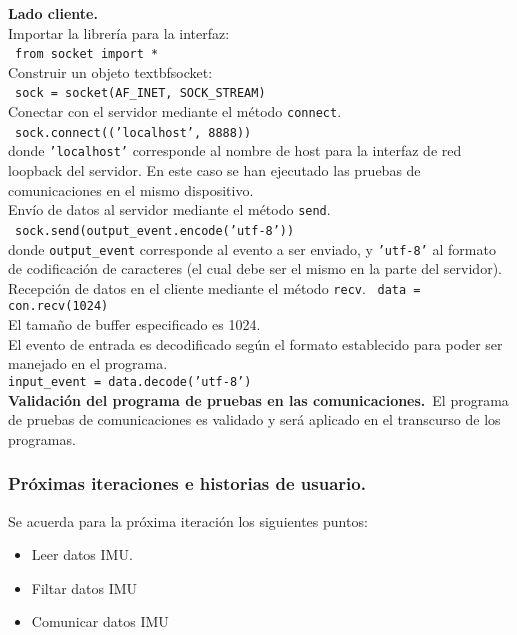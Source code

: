\textbf{Lado cliente.}\\
Importar la librería para la interfaz:\\
\medskip\
\texttt{from socket import *}\\
Construir un objeto textbf{socket}:\\
\medskip\
\texttt{sock = socket(AF\_INET, SOCK\_STREAM)}\\
Conectar con el servidor mediante el método \texttt{connect}.\\
\medskip\
\texttt{sock.connect(('localhost', 8888))}\\
donde \texttt{'localhost'} corresponde al nombre de host para la interfaz de red loopback del servidor. En este caso se han ejecutado las pruebas de comunicaciones en el mismo dispositivo.\\
Envío de datos al servidor mediante el método \texttt{send}.\\
\medskip\
\texttt{sock.send(output\_event.encode('utf-8'))}\\
donde \texttt{output\_event} corresponde al evento a ser enviado, y \texttt{'utf-8'} al formato de codificación de caracteres (el cual debe ser el mismo en la parte del servidor).\\
Recepción de datos en el cliente mediante el método \texttt{recv}.\
\medskip
\texttt{data = con.recv(1024)}\\
El tamaño de buffer especificado es 1024.\\
El evento de entrada es decodificado según el formato establecido para poder ser manejado en el programa.\\
\medskip
\texttt{input\_event = data.decode('utf-8')}\\

\textbf{Validación del programa de pruebas en las comunicaciones.}\
El programa de pruebas de comunicaciones es validado y será aplicado en el transcurso de los programas.



\subsubsection{Próximas iteraciones e historias de usuario.}
Se acuerda para la próxima iteración los siguientes puntos:
\begin{itemize}
\item Leer datos IMU.
\item Filtar datos IMU
\item Comunicar datos IMU
\end{itemize}



